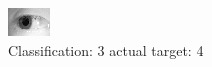 \begin{figure}[h!]
\begin{center}
\includegraphics[width=0.60\columnwidth]{figures/ID1209_class_3_target_4.png}
\end{center}
\caption{ Classification: 3 actual target: 4}
\label{fig:ID1209_class_3_target_4}
\end{figure}
